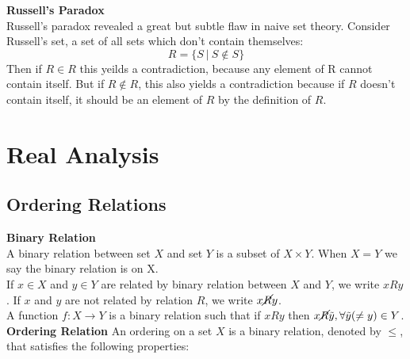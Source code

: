 \documentclass{article}
\numberwithin{theorem}{subsection}
\numberwithin{theorem}{subsubsection}
\numberwithin{lemma}{subsection}
\numberwithin{lemma}{subsubsection}
\theoremstyle{definition}
\numberwithin{definition}{subsection}
\numberwithin{definition}{subsubsection}
\begin{document}
\noindent \textbf{Russell's Paradox} \\
\indent Russell's paradox revealed a great but subtle flaw in naive set theory. Consider Russell's set, a set of all sets which don't contain themselves:
\begin{equation*}
    R = \{S\ |\ S \notin S\}
\end{equation*}
\noindent Then if $R \in R$ this yeilds a contradiction, because any element of R cannot contain itself. But if $R \notin R$, this also yields a contradiction because if $R$ doesn't contain itself, it should be an element of $R$ by the definition of $R$.

\newpage
\begin{comment}
======================================================================================================================================================================================================================================================================================REAL ANALYSIS================================================ ====================================================================================================================================================================================================================================
\end{comment}

\section{Real Analysis}

\subsection{Ordering Relations}
\noindent \textbf{Binary Relation} \\
\indent A binary relation between set $X$ and set $Y$ is a subset of $X \times Y$. When $X = Y$ we say the binary relation is on X.
\\
\indent If $x \in X$ and $y \in Y$ are related by binary relation between $X$ and $Y$, we write $xRy$. If $x$ and $y$ are not related by relation $R$, we write $x\cancel{R}y$. \\
\indent A function $f: X \rightarrow Y$ is a binary relation such that if $xRy$ then $x\cancel{R}\Tilde{y}, \forall \Tilde{y}( \neq y) \in Y$.
\\

\noindent \textbf{Ordering Relation} An ordering on a set $X$ is a binary relation, denoted by $\leq$, that satisfies the following properties:
\end{document}
